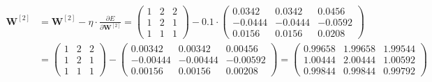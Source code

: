 \documentclass[12pt]{article}
\begin{document}
\begin{enumerate}
\begin{equation*}
    \begin{aligned}
        \mathbf{W}^{[2]} &= \mathbf{W}^{[2]} - \eta \cdot \frac{\partial E}{\partial \mathbf{W}^{[2]}} = \begin{pmatrix}
            1 & 2 & 2\\
            1 & 2 & 1\\
            1 & 1 & 1
        \end{pmatrix} - 0.1 \cdot \begin{pmatrix}
            0.0342 & 0.0342 & 0.0456\\
            -0.0444 & -0.0444 & -0.0592\\
            0.0156 & 0.0156 & 0.0208
        \end{pmatrix} \\ &= \begin{pmatrix}
            1 & 2 & 2\\
            1 & 2 & 1\\
            1 & 1 & 1
        \end{pmatrix} - \begin{pmatrix}
            0.00342 & 0.00342 & 0.00456\\
            -0.00444 & -0.00444 & -0.00592\\
            0.00156 & 0.00156 & 0.00208
        \end{pmatrix} = \begin{pmatrix}
            0.99658 & 1.99658 & 1.99544\\
            1.00444 & 2.00444 & 1.00592\\
            0.99844 & 0.99844 & 0.99792
        \end{pmatrix}\\
    \end{aligned}
\end{equation*}


\end{enumerate}
\end{document}

